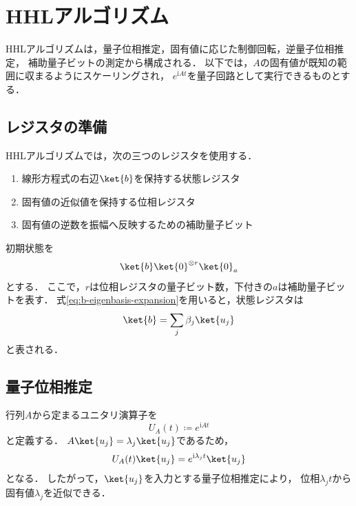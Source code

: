 \section{HHLアルゴリズム}
\label{sec:hhl-algorithm}

HHLアルゴリズムは，量子位相推定，固有値に応じた制御回転，逆量子位相推定，
補助量子ビットの測定から構成される\cite{hhl2009}．
以下では，$A$の固有値が既知の範囲に収まるようにスケーリングされ，
$e^{\mathrm{i}At}$を量子回路として実行できるものとする．

\subsection{レジスタの準備}
\label{subsec:hhl-register-preparation}

HHLアルゴリズムでは，次の三つのレジスタを使用する．

\begin{enumerate}[(1)]
  \item 線形方程式の右辺$\ket{b}$を保持する状態レジスタ
  \item 固有値の近似値を保持する位相レジスタ
  \item 固有値の逆数を振幅へ反映するための補助量子ビット
\end{enumerate}

初期状態を
\begin{align*}
  \ket{b}\ket{0}^{\otimes r}\ket{0}_{a}
\end{align*}
とする．
ここで，$r$は位相レジスタの量子ビット数，下付きの$a$は補助量子ビットを表す．
式\eqref{eq:b-eigenbasis-expansion}を用いると，状態レジスタは
\begin{align*}
  \ket{b}
  =
  \sum_j\beta_j\ket{u_j}
\end{align*}
と表される．

\subsection{量子位相推定}
\label{subsec:hhl-quantum-phase-estimation}

行列$A$から定まるユニタリ演算子を
\begin{equation}
  U_A(t)
  \coloneq
  e^{\mathrm{i}At}
  \label{eq:hamiltonian-simulation-unitary}
\end{equation}
と定義する．
$A\ket{u_j}=\lambda_j\ket{u_j}$であるため，
\begin{align*}
  U_A(t)\ket{u_j}
  =
  e^{\mathrm{i}\lambda_jt}\ket{u_j}
\end{align*}
となる．
したがって，$\ket{u_j}$を入力とする量子位相推定により，
位相$\lambda_jt$から固有値$\lambda_j$を近似できる．


